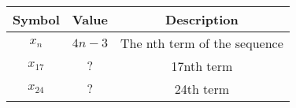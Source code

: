 
    \begin{tabular}{|c|c|c|}
    \hline
     \textbf{Symbol} & \textbf{Value} &
     \textbf{Description}\\
    \hline
     $x_n$ &  $4n-3$ & The nth term of the sequence\\[6pt]
    \hline 
     $x_{17}$ &  $?$ & 17nth term \\[6pt]
    \hline
     $x_{24}$ &  $?$ & 24th term\\[6pt]
    \hline
     
\end{tabular}
